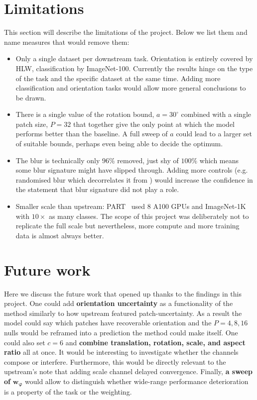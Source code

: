 \documentclass[final_report.tex]{subfiles}
\begin{document}
\section{Limitations}\label{sec:limitations}
This section will describe the limitations of the project. Below we list them and name measures that would remove them:
\begin{itemize}
\item Only a single dataset per downstream task. Orientation is entirely covered by HLW, classification by ImageNet-100. Currently the results hinge on the type of the task and the specific dataset at the same time. Adding more classification and orientation tasks would allow more general conclusions to be drawn.
\item There is a single value of the rotation bound, $a=30^\circ$ combined with a single patch size, $P=32$ that together give the only point at which the model performs better than the baseline. A full sweep of $a$ could lead to a larger set of suitable bounds, perhaps even being able to decide the optimum.
\item The blur is technically only $96\%$ removed, just shy of $100\%$ which means some blur signature might have slipped through. Adding more controls (e.g. randomised blur which decorrelates it from \dphi{}) would increase the confidence in the statement that blur signature did not play a role.
\item Smaller scale than upstream: PART~\cite{part} used 8 A100 GPUs and ImageNet-1K with $10\times$ as many classes. The scope of this project was deliberately not to replicate the full scale but nevertheless, more compute and more training data is almost always better.
\end{itemize}


\section{Future work}\label{sec:future-work}
Here we discuss the future work that opened up thanks to the findings in this project. One could add \textbf{orientation uncertainty} as a functionality of the method similarly to how upstream featured patch-uncertainty. As a result the model could say which patches have recoverable orientation and the $P=4,8,16$ nulls would be reframed into a prediction the method could make itself. One could also set $c=6$ and \textbf{combine translation, rotation, scale, and aspect ratio} all at once. It would be interesting to investigate whether the channels compose or interfere. Furthermore, this would be directly relevant to the upstream's note that adding scale channel delayed \dxy{} convergence. Finally, \textbf{a sweep of} $\mathbf{w_\varphi}$ would allow to distinguish whether wide-range performance deterioration is a property of the task or the weighting.


\ifSubfilesClassLoaded{\pagebreak\printbibliography}{}
\end{document}
